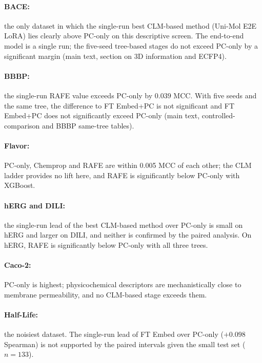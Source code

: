 \documentclass[9pt,a4paper]{article}
\begin{document}
\paragraph{BACE:} the only dataset in which the single-run best CLM-based method (Uni-Mol E2E LoRA) lies clearly above PC-only on this descriptive screen. The end-to-end model is a single run; the five-seed tree-based stages do not exceed PC-only by a significant margin (main text, section on 3D information and ECFP4).

\paragraph{BBBP:} the single-run RAFE value exceeds PC-only by $0.039$ MCC. With five seeds and the same tree, the difference to FT Embed+PC is not significant and FT Embed+PC does not significantly exceed PC-only (main text, controlled-comparison and BBBP same-tree tables).

\paragraph{Flavor:} PC-only, Chemprop and RAFE are within 0.005 MCC of each other; the CLM ladder provides no lift here, and RAFE is significantly below PC-only with XGBoost.

\paragraph{hERG and DILI:} the single-run lead of the best CLM-based method over PC-only is small on hERG and larger on DILI, and neither is confirmed by the paired analysis. On hERG, RAFE is significantly below PC-only with all three trees.

\paragraph{Caco-2:} PC-only is highest; physicochemical descriptors are mechanistically close to membrane permeability, and no CLM-based stage exceeds them.

\paragraph{Half-Life:} the noisiest dataset. The single-run lead of FT Embed over PC-only ($+0.098$ Spearman) is not supported by the paired intervals given the small test set ($n=133$).



\end{document}
